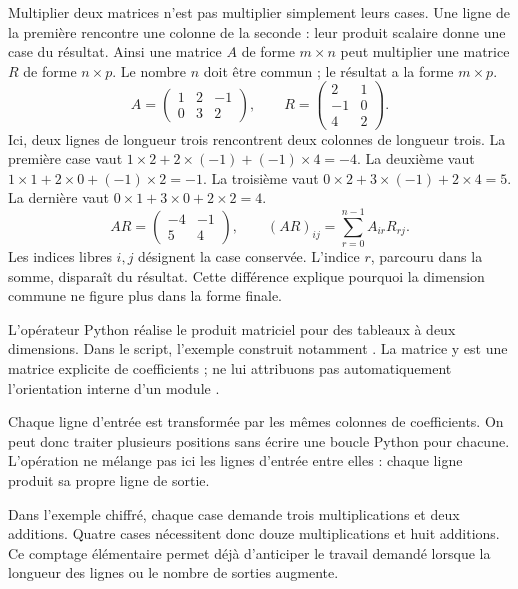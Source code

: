 Multiplier deux matrices n'est pas multiplier simplement leurs cases.
Une ligne de la première rencontre une colonne de la seconde :
leur produit scalaire donne une case du résultat. Ainsi une matrice
\(A\) de forme \(m\times n\) peut multiplier une matrice \(R\)
de forme \(n\times p\). Le nombre \(n\) doit être commun ;
le résultat a la forme \(m\times p\).
\[
 A=\begin{pmatrix}1&2&-1\\0&3&2\end{pmatrix},
 \qquad R=\begin{pmatrix}2&1\\-1&0\\4&2\end{pmatrix}.
\]
Ici, deux lignes de longueur trois rencontrent deux colonnes de
longueur trois. La première case vaut
\(1\times2+2\times(-1)+(-1)\times4=-4\).
La deuxième vaut \(1\times1+2\times0+(-1)\times2=-1\).
La troisième vaut \(0\times2+3\times(-1)+2\times4=5\).
La dernière vaut \(0\times1+3\times0+2\times2=4\).
\[
 AR=\begin{pmatrix}-4&-1\\5&4\end{pmatrix},
 \qquad (AR)_{ij}=\sum_{r=0}^{n-1}A_{ir}R_{rj}.
\]
Les indices libres \(i,j\) désignent la case conservée.
L'indice \(r\), parcouru dans la somme, disparaît du résultat.
Cette différence explique pourquoi la dimension commune ne figure
plus dans la forme finale.

L'opérateur Python  réalise le produit matriciel pour
des tableaux à deux dimensions. Dans le script, l'exemple
 construit notamment
. La matrice  y est une matrice
explicite de coefficients ; ne lui attribuons pas automatiquement
l'orientation interne d'un module .

Chaque ligne d'entrée est transformée par les mêmes colonnes de
coefficients. On peut donc traiter plusieurs positions sans écrire
une boucle Python pour chacune. L'opération ne mélange pas ici
les lignes d'entrée entre elles : chaque ligne produit sa propre
ligne de sortie.

Dans l'exemple chiffré, chaque case demande trois multiplications
et deux additions. Quatre cases nécessitent donc douze multiplications
et huit additions. Ce comptage élémentaire permet déjà d'anticiper
le travail demandé lorsque la longueur des lignes ou le nombre
de sorties augmente.

